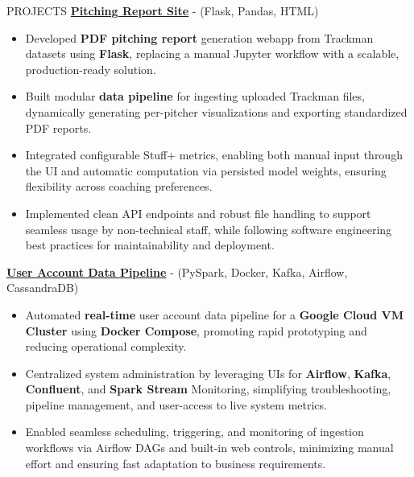 \documentclass{resume3}
\begin{document}
\begin{rSection}{PROJECTS}
{\underline{{\bf Pitching Report Site}}} - (Flask, Pandas, HTML)
\begin{itemize}
\item Developed \textbf{PDF pitching report} generation webapp from Trackman datasets using \textbf{Flask}, replacing a manual Jupyter workflow with a scalable, production-ready solution.
\item Built modular \textbf{data pipeline} for ingesting uploaded Trackman files, dynamically generating per-pitcher visualizations and exporting standardized PDF reports.
\item Integrated configurable Stuff+ metrics, enabling both manual input through the UI and automatic computation via persisted model weights, ensuring flexibility across coaching preferences.
\item Implemented clean API endpoints and robust file handling to support seamless usage by non-technical staff, while following software engineering best practices for maintainability and deployment.
\end{itemize}

{{\underline{{\bf User Account Data Pipeline}}}} - (PySpark, Docker, Kafka, Airflow, CassandraDB)
\begin{itemize}
  \item Automated \textbf{real-time} user account data pipeline for a \textbf{Google Cloud VM Cluster} using \textbf{Docker Compose}, promoting rapid prototyping and reducing operational complexity.
\item Centralized system administration by leveraging UIs for \textbf{Airflow}, \textbf{Kafka}, \textbf{Confluent}, and \textbf{Spark Stream} Monitoring, simplifying troubleshooting, pipeline management, and user-access to live system metrics.
\item Enabled seamless scheduling, triggering, and monitoring of ingestion workflows via Airflow DAGs and built-in web controls, minimizing manual effort and ensuring fast adaptation to business requirements.
\end{itemize}
\end{rSection}
\end{document}
